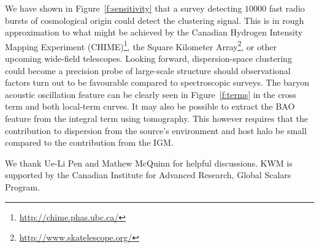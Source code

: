 \documentclass[twocolumn,prl,floatfix]{revtex4-1}
\begin{document}
We have
shown in Figure~\ref{f:sensitivity}
that a survey detecting $10000$ fast radio bursts of cosmological
origin could detect the
clustering signal. This is in rough
approximation to what might be achieved by the Canadian Hydrogen Intensity
Mapping Experiment (CHIME)\footnote{\url{http://chime.phas.ubc.ca/}}, the
Square Kilometer Array\footnote{\url{http://www.skatelescope.org/}},
or other upcoming wide-field telescopes.
Looking forward, dispersion-space
clustering could become a precision probe of large-scale structure should
observational factors turn out to be favourable compared to spectroscopic
surveys. The baryon acoustic oscillation feature can be clearly seen in
Figure~\ref{f:terms} in the cross term and both
local-term curves. It may also be possible to extract the BAO feature
from the integral
term using tomography.
This however requires that the contribution to dispersion from
the source's environment and host halo be small compared to the
contribution from the IGM.


\begin{acknowledgments}

We thank Ue-Li Pen and Mathew McQuinn for helpful discussions.
%
KWM is supported by the Canadian Institute for Advanced Research, Global Scalars
Program.

\end{acknowledgments}




\end{document}

